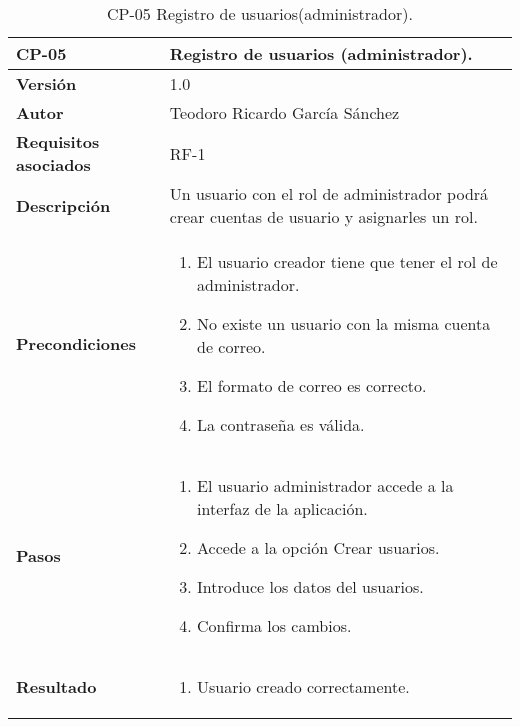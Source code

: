 \begin{table}[p]
	\centering
	\begin{tabularx}{\linewidth}{ p{} p{} }
		\toprule
		\textbf{CP-05}    & \textbf{Registro de usuarios (administrador).}\\
		\toprule
		\textbf{Versión}              & 1.0    \\
		\textbf{Autor}                & Teodoro Ricardo García Sánchez \\
		\textbf{Requisitos asociados} & RF-1 \\
		\textbf{Descripción}          & Un usuario con el rol de administrador podrá crear cuentas de usuario y asignarles un rol. \\
		\textbf{Precondiciones}         & 
		\begin{enumerate}
			\def\labelenumi{\arabic{enumi}.}
			\tightlist
			\item El usuario creador tiene que tener el rol de administrador.
			\item No existe un usuario con la misma cuenta de correo.
			\item El formato de correo es correcto.
			\item La contraseña es válida.
		\end{enumerate}\\
		\textbf{Pasos}             &
		\begin{enumerate}
			\def\labelenumi{\arabic{enumi}.}
			\tightlist
			\item El usuario administrador accede a la interfaz de la aplicación.
			\item Accede a la opción Crear usuarios.
			\item Introduce los datos del usuarios.
			\item Confirma los cambios.
		\end{enumerate}\\
		\textbf{Resultado}          & 
		\begin{enumerate}
			\item Usuario creado correctamente.
		\end{enumerate}\\
		\bottomrule
	\end{tabularx}
	\caption{CP-05 Registro de usuarios(administrador).}
\end{table}

